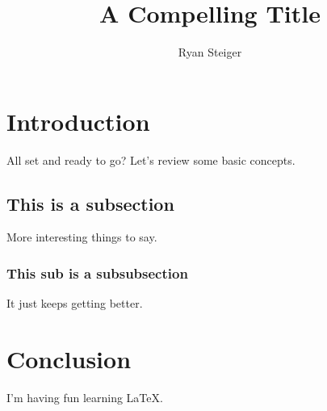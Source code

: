 \documentclass{article}
\title{A Compelling Title}
\author{Ryan Steiger}
\begin{document}
\maketitle

\section{Introduction}

All set and ready to go? Let's review some basic concepts.

\subsection{This is a subsection}

More interesting things to say.

\subsubsection{This sub is a subsubsection}

It just keeps getting better.

\section{Conclusion}

I'm having fun learning \LaTeX.
  
\end{document}
